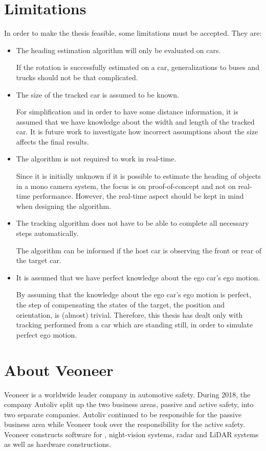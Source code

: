 \section{Limitations}
In order to make the thesis feasible, some limitations must be accepted. They are:

\begin{itemize}	
	\item The heading estimation algorithm will only be evaluated on cars.

	If the rotation is successfully estimated on a car, generalizations to \eg buses and trucks should not be that complicated.

	\item The size of the tracked car is assumed to be known.

	For simplification and in order to have some  distance information, it is assumed that we have knowledge about the width and length of the tracked car.
	It is future work to investigate how incorrect assumptions about the size affects the final results.

	\item The algorithm is not required to work in real-time.

	Since it is initially unknown if it is possible to estimate the heading of objects in a mono camera system, the focus is on proof-of-concept and not on real-time performance.
	However, the real-time aspect should be kept in mind when designing the algorithm.

    \item The tracking algorithm does not have to be able to complete all necessary steps automatically.

    The algorithm can \eg be informed if the host car is observing the front or rear of the target car.

	\item It is assumed that we have perfect knowledge about the ego car's ego motion.

	By assuming that the knowledge about the ego car's ego motion is perfect, the step of compensating the states of the target, \ie the position and orientation, is (almost) trivial.
	Therefore, this thesis has dealt only with tracking performed from a car which are standing still, in order to simulate perfect ego motion.
\end{itemize}

\newpage

\section{About Veoneer}
Veoneer is a worldwide leader company in automotive safety.
During 2018, the company Autoliv split up the two business areas, passive and active safety, into two separate companies.
Autoliv continued to be responsible for the passive business area while Veoneer took over the responsibility for the active safety.
Veoneer constructs software for \abbrADAS, night-vision systems, radar and LiDAR systems as well as hardware constructions.
\cite{Veoneer:2018}

